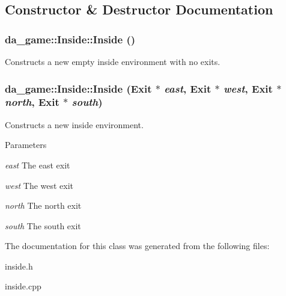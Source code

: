 \subsection{Constructor \& Destructor Documentation}
\hypertarget{classda__game_1_1Inside_a90752ab2ce2d5991185aba47e962befd}{
\subsubsection[{Inside}]{\setlength{\rightskip}{0pt plus 5cm}da\_\-game::Inside::Inside ()}}
\label{classda__game_1_1Inside_a90752ab2ce2d5991185aba47e962befd}
Constructs a new empty inside environment with no exits. \hypertarget{classda__game_1_1Inside_aa36eb3ecd2ad203540866314d5392078}{
\subsubsection[{Inside}]{\setlength{\rightskip}{0pt plus 5cm}da\_\-game::Inside::Inside ({\bf Exit} $\ast$ {\em east}, \/  {\bf Exit} $\ast$ {\em west}, \/  {\bf Exit} $\ast$ {\em north}, \/  {\bf Exit} $\ast$ {\em south})}}
\label{classda__game_1_1Inside_aa36eb3ecd2ad203540866314d5392078}
Constructs a new inside environment.


\begin{DoxyParams}{Parameters}
\item[{\em east}]The east exit \item[{\em west}]The west exit \item[{\em north}]The north exit \item[{\em south}]The south exit \end{DoxyParams}


The documentation for this class was generated from the following files:\begin{DoxyCompactItemize}
\item 
inside.h\item 
inside.cpp\end{DoxyCompactItemize}
